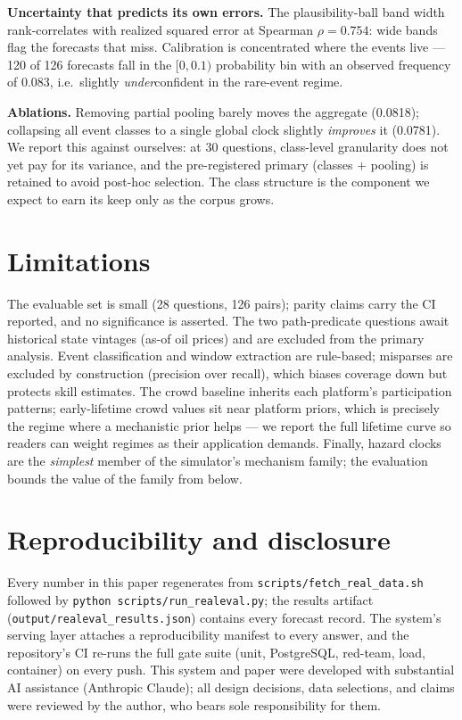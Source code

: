 \documentclass[11pt]{article}
\begin{document}
\textbf{Uncertainty that predicts its own errors.} The plausibility-ball band
width rank-correlates with realized squared error at Spearman
$\rho = 0.754$: wide bands flag the forecasts that miss. Calibration is
concentrated where the events live --- 120 of 126 forecasts fall in the
$[0,0.1)$ probability bin with an observed frequency of 0.083, i.e.\ slightly
\emph{under}confident in the rare-event regime.

\textbf{Ablations.} Removing partial pooling barely moves the aggregate
(0.0818); collapsing all event classes to a single global clock slightly
\emph{improves} it (0.0781). We report this against ourselves: at 30
questions, class-level granularity does not yet pay for its variance, and the
pre-registered primary (classes + pooling) is retained to avoid post-hoc
selection. The class structure is the component we expect to earn its keep
only as the corpus grows.

\section{Limitations}
The evaluable set is small (28 questions, 126 pairs); parity claims carry the
CI reported, and no significance is asserted. The two path-predicate
questions await historical state vintages (as-of oil prices) and are excluded
from the primary analysis. Event classification and window extraction are
rule-based; misparses are excluded by construction (precision over recall),
which biases coverage down but protects skill estimates. The crowd baseline
inherits each platform's participation patterns; early-lifetime crowd values
sit near platform priors, which is precisely the regime where a mechanistic
prior helps --- we report the full lifetime curve so readers can weight
regimes as their application demands. Finally, hazard clocks are the
\emph{simplest} member of the simulator's mechanism family; the evaluation
bounds the value of the family from below.

\section{Reproducibility and disclosure}
Every number in this paper regenerates from
\texttt{scripts/fetch\_real\_data.sh} followed by
\texttt{python scripts/run\_realeval.py}; the results artifact
(\texttt{output/realeval\_results.json}) contains every forecast record. The
system's serving layer attaches a reproducibility manifest to every answer,
and the repository's CI re-runs the full gate suite (unit, PostgreSQL,
red-team, load, container) on every push. This system and paper were
developed with substantial AI assistance (Anthropic Claude); all design
decisions, data selections, and claims were reviewed by the author, who bears
sole responsibility for them.
\end{document}
